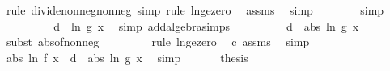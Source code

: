 \begin{isabellebody}
\ {\isacharparenleft}{\kern0pt}rule\ divide{\isacharunderscore}{\kern0pt}nonneg{\isacharunderscore}{\kern0pt}nonneg{\isacharcomma}{\kern0pt}\ simp{\isacharcomma}{\kern0pt}\ rule\ ln{\isacharunderscore}{\kern0pt}ge{\isacharunderscore}{\kern0pt}zero{\isacharparenright}{\kern0pt}\ \isamarkupfalse%
\ assms{\isacharparenleft}{\kern0pt}{}{\isacharparenright}{\kern0pt}\ \isamarkupfalse%
\ simp\isanewline
\ \ \ \ \ \ \isamarkupfalse%
\ simp\isanewline
\ \ \ \ \isamarkupfalse%
\ \isamarkupfalse%
\ {\isachardoublequoteopen}{\isachardot}{\kern0pt}{\isachardot}{\kern0pt}{\isachardot}{\kern0pt}\ {\isacharequal}{\kern0pt}\ d\ {\isacharasterisk}{\kern0pt}\ ln\ {\isacharparenleft}{\kern0pt}g\ x{\isacharparenright}{\kern0pt}{\isachardoublequoteclose}\ \isamarkupfalse%
\ {\isacharparenleft}{\kern0pt}simp\ add{\isacharcolon}{\kern0pt}algebra{\isacharunderscore}{\kern0pt}simps{\isacharparenright}{\kern0pt}\isanewline
\ \ \ \ \isamarkupfalse%
\ \isamarkupfalse%
\ {\isachardoublequoteopen}{\isachardot}{\kern0pt}{\isachardot}{\kern0pt}{\isachardot}{\kern0pt}\ {\isacharequal}{\kern0pt}\ d\ {\isacharasterisk}{\kern0pt}\ abs\ {\isacharparenleft}{\kern0pt}ln\ {\isacharparenleft}{\kern0pt}g\ x{\isacharparenright}{\kern0pt}{\isacharparenright}{\kern0pt}{\isachardoublequoteclose}\isanewline
\ \ \ \ \ \ \isamarkupfalse%
\ {\isacharparenleft}{\kern0pt}subst\ abs{\isacharunderscore}{\kern0pt}of{\isacharunderscore}{\kern0pt}nonneg{\isacharparenright}{\kern0pt}\isanewline
\ \ \ \ \ \ \ \isamarkupfalse%
\ {\isacharparenleft}{\kern0pt}rule\ ln{\isacharunderscore}{\kern0pt}ge{\isacharunderscore}{\kern0pt}zero{\isacharparenright}{\kern0pt}\ \isamarkupfalse%
\ c\ assms{\isacharparenleft}{\kern0pt}{}{\isacharparenright}{\kern0pt}\ \isamarkupfalse%
\ simp{\isacharplus}{\kern0pt}\isanewline
\ \ \ \ \isamarkupfalse%
\ \isamarkupfalse%
\ {\isachardoublequoteopen}abs\ {\isacharparenleft}{\kern0pt}ln\ {\isacharparenleft}{\kern0pt}f\ x{\isacharparenright}{\kern0pt}{\isacharparenright}{\kern0pt}\ {\isasymle}\ d\ {\isacharasterisk}{\kern0pt}\ abs\ {\isacharparenleft}{\kern0pt}ln\ {\isacharparenleft}{\kern0pt}g\ x{\isacharparenright}{\kern0pt}{\isacharparenright}{\kern0pt}{\isachardoublequoteclose}\ \isamarkupfalse%
\ simp\isanewline
\ \ \isamarkupfalse%
\isanewline
\ \ \isamarkupfalse%
\ {\isacharquery}{\kern0pt}thesis\isanewline

\end{isabellebody}
